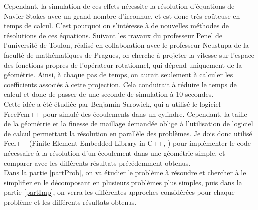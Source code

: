 Cependant, la simulation de ces effets nécessite la résolution d'équations de Navier-Stokes avec un grand nombre d'inconnue, et est donc très coûteuse en temps de calcul. C'est pourquoi on s'intéresse à de nouvelles méthodes de résolutions de ces équations. Suivant les travaux du professeur Penel de l'université de Toulon, réalisé en collaboration avec le professeur Neustupa de la faculté de mathématiques de Pragues, on cherche à projeter la vitesse sur l'espace des fonctions propres de l'opérateur rotationnel, qui dépend uniquement de la géométrie. Ainsi, à chaque pas de temps, on aurait seulement à calculer les coefficients associés à cette projection. Cela conduirait à réduire le temps de calcul et donc de passer de une seconde de simulation à 10 secondes.\\

Cette idée a été étudiée par Benjamin Surowiek, qui a utilisé le logiciel FreeFem++ pour simulé des écoulements dans un cylindre. Cependant, la taille de la géométrie et la finesse de maillage demandée oblige à l'utilisation de logiciel de calcul permettant la résolution en parallèle des problèmes. Je dois donc utilisé Feel++ (Finite Element Embedded Library in C++, \cite{PRUDHOMME:2012:HAL-00662868:3,feelpp098:10046} ) pour implémenter le code nécessaire à la résolution d'un écoulement dans une géométrie simple, et comparer avec les différents résultats précédemment obtenus.\\

Dans la partie \ref{partProb}, on va étudier le problème à résoudre et chercher à le simplifier en le décomposant en plusieurs problèmes plus simples, puis dans la partie \ref{partImp}, on verra les différentes approches considérées pour chaque problème et les différents résultats obtenus.

